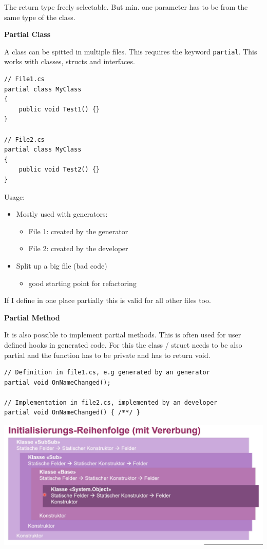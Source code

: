 \documentclass[11pt,twoside,landscape]{article}
\begin{document}
\begin{multicols}{3}
The return type freely selectable.
But min. one parameter has to be from the same type of the class.

\textbf{Partial Class}

A class can be spitted in multiple files.
This requires the keyword \texttt{partial}.
This works with classes, structs and interfaces.
\lstset{language=csharp,label= ,caption= ,captionpos=b,numbers=none}
\begin{lstlisting}
// File1.cs
partial class MyClass
{
    public void Test1() {}
}

// File2.cs
partial class MyClass
{
    public void Test2() {}
}
\end{lstlisting}

Usage:
\begin{itemize}
\item Mostly used with generators:
\begin{itemize}
\item File 1: created by the generator
\item File 2: created by the developer
\end{itemize}
\item Split up a big file (bad code)
\begin{itemize}
\item good starting point for refactoring
\end{itemize}
\end{itemize}


If I define in one place partially this is valid for all other files too.

\textbf{Partial Method}

It is also possible to implement partial methods.
This is often used for user defined hooks in generated code.
For this the class / struct needs to be also partial and the function has to be private and has to return void.

\lstset{language=csharp,label= ,caption= ,captionpos=b,numbers=none}
\begin{lstlisting}
// Definition in file1.cs, e.g generated by an generator
partial void OnNameChanged();

// Implementation in file2.cs, implemented by an developer
partial void OnNameChanged() { /**/ }
\end{lstlisting}


\begin{center}
\includegraphics[width=.9\linewidth]{img/initialisierungsreihenfolge.png}
\label{orgc1b0492}
\end{center}


\end{multicols}
\end{document}
